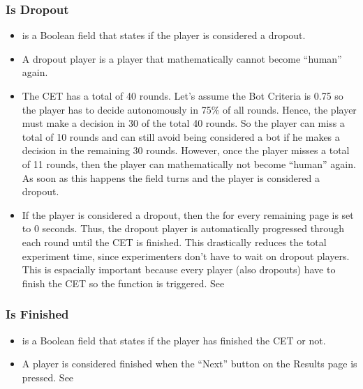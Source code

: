 \documentclass[letterpaper,10pt,english]{sphinxmanual}
\begin{document}
\subsubsection{Is Dropout}
\label{\detokenize{Player_fields:is-dropout}}\label{\detokenize{Player_fields:is-dropout-ref}}\begin{itemize}
\item {} 
 is a Boolean field that states if the player is considered a dropout.

\item {} 
A dropout player is a player that mathematically cannot become “human” again.

\item {} 
The CET has a total of 40 rounds. Let’s assume the Bot Criteria is 0.75 so the player
has to decide autonomously in 75\% of all rounds. Hence, the player must make a decision in 30 of the total 40 rounds.
So the player can miss a total of 10 rounds and can still avoid being considered a bot if he makes a decision in
the remaining 30 rounds. However, once the player misses a total of 11 rounds, then the player can mathematically
not become “human” again. As soon as this happens the  field turns  and the player is
considered a dropout.

\item {} 
If the player is considered a dropout, then the {\hyperref[\detokenize{pages:timeout-ref}]{}} for every remaining page is set to 0 seconds.
Thus, the dropout player is automatically progressed through each round until the CET is finished.
This drastically reduces the total experiment time, since experimenters don’t have to wait on dropout players.
This is espacially important because every player (also dropouts) have to finish the CET so the
 function is triggered. See {\hyperref[\detokenize{Subsession_fields:mail-call-ref}]{}}

\end{itemize}


\subsubsection{Is Finished}
\label{\detokenize{Player_fields:is-finished}}\begin{itemize}
\item {} 
 is a Boolean field that states if the player has finished the CET or not.

\item {} 
A player is considered finished when the “Next” button on the Results page is pressed. See {\hyperref[\detokenize{pages:results}]{}}

\end{itemize}
\end{document}
